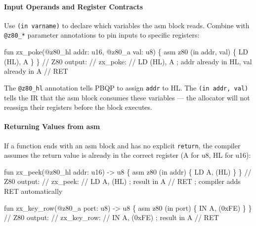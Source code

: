 \documentclass[
  11pt,
]{article}
\newenvironment{Shaded}{\begin{snugshade}}{\end{snugshade}}
\newcommand{\NormalTok}[1]{#1}
\begin{document}
\hypertarget{input-operands-and-register-contracts}{%
\paragraph{Input Operands and Register
Contracts}\label{input-operands-and-register-contracts}}

Use \texttt{(in\ varname)} to declare which variables the asm block
reads. Combine with \texttt{@z80\_*} parameter annotations to pin inputs
to specific registers:

\begin{Shaded}
\begin{Highlighting}[]
\NormalTok{fun zx\_poke(@z80\_hl addr: u16, @z80\_a val: u8) \{}
\NormalTok{    asm z80 (in addr, val) \{ LD (HL), A \}}
\NormalTok{\}}
\NormalTok{// Z80 output:}
\NormalTok{//   zx\_poke:}
\NormalTok{//       LD (HL), A    ; addr already in HL, val already in A}
\NormalTok{//       RET}
\end{Highlighting}
\end{Shaded}

The \texttt{@z80\_hl} annotation tells PBQP to assign \texttt{addr} to
HL. The \texttt{(in\ addr,\ val)} tells the IR that the asm block
consumes these variables --- the allocator will not reassign their
registers before the block executes.

\hypertarget{returning-values-from-asm}{%
\paragraph{Returning Values from asm}\label{returning-values-from-asm}}

If a function ends with an asm block and has no explicit
\texttt{return}, the compiler assumes the return value is already in the
correct register (A for u8, HL for u16):

\begin{Shaded}
\begin{Highlighting}[]
\NormalTok{fun zx\_peek(@z80\_hl addr: u16) {-}\textgreater{} u8 \{}
\NormalTok{    asm z80 (in addr) \{ LD A, (HL) \}}
\NormalTok{\}}
\NormalTok{// Z80 output:}
\NormalTok{//   zx\_peek:}
\NormalTok{//       LD A, (HL)    ; result in A}
\NormalTok{//       RET           ; compiler adds RET automatically}

\NormalTok{fun zx\_key\_row(@z80\_a port: u8) {-}\textgreater{} u8 \{}
\NormalTok{    asm z80 (in port) \{ IN A, (0xFE) \}}
\NormalTok{\}}
\NormalTok{// Z80 output:}
\NormalTok{//   zx\_key\_row:}
\NormalTok{//       IN A, (0xFE)  ; result in A}
\NormalTok{//       RET}
\end{Highlighting}
\end{Shaded}
\end{document}
